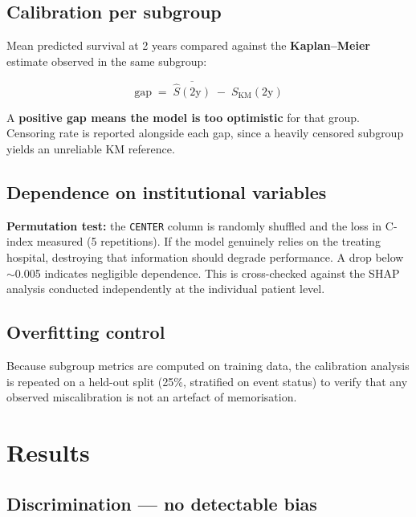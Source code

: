 \documentclass[11pt,a4paper]{article}
\newcommand{\var}[1]{\texttt{#1}}                      %
\begin{document}
\subsection{Calibration per subgroup}

Mean predicted survival at 2 years compared against the \textbf{Kaplan--Meier} estimate
observed in the same subgroup:

\begin{equation}
\text{gap} \;=\; \overline{\hat{S}(2\text{y})} \;-\; S_{\text{KM}}(2\text{y})
\end{equation}

A \textbf{positive gap means the model is too optimistic} for that group. Censoring rate is
reported alongside each gap, since a heavily censored subgroup yields an unreliable KM
reference.

\subsection{Dependence on institutional variables}

\textbf{Permutation test:} the \var{CENTER} column is randomly shuffled and the loss in C-index
measured (5 repetitions). If the model genuinely relies on the treating hospital, destroying
that information should degrade performance. A drop below $\sim$0.005 indicates negligible
dependence. This is cross-checked against the SHAP analysis conducted independently at the
individual patient level.

\subsection{Overfitting control}

Because subgroup metrics are computed on training data, the calibration analysis is repeated on
a held-out split (25\%, stratified on event status) to verify that any observed miscalibration
is not an artefact of memorisation.

\section{Results}

\subsection{Discrimination --- no detectable bias}
\end{document}
